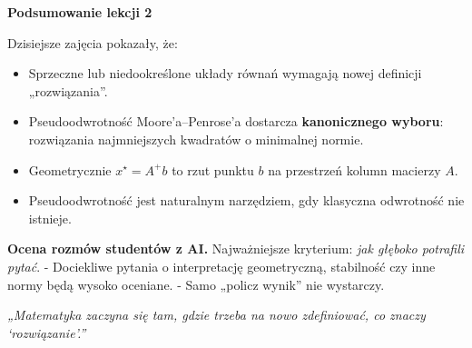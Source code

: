 \documentclass[12pt,a4paper]{article}
\begin{document}
\begin{center}
\Large \textbf{Podsumowanie lekcji 2}
\end{center}

\bigskip

Dzisiejsze zajęcia pokazały, że:
\begin{itemize}
    \item Sprzeczne lub niedookreślone układy równań wymagają nowej definicji „rozwiązania”.
    \item Pseudoodwrotność Moore’a--Penrose’a dostarcza \textbf{kanonicznego wyboru}: rozwiązania najmniejszych kwadratów o minimalnej normie.
    \item Geometrycznie $x^\star=A^+b$ to rzut punktu $b$ na przestrzeń kolumn macierzy $A$.
    \item Pseudoodwrotność jest naturalnym narzędziem, gdy klasyczna odwrotność nie istnieje.
\end{itemize}

\bigskip

\textbf{Ocena rozmów studentów z AI.}  
Najważniejsze kryterium: \emph{jak głęboko potrafili pytać}.  
- Dociekliwe pytania o interpretację geometryczną, stabilność czy inne normy będą wysoko oceniane.  
- Samo „policz wynik” nie wystarczy.  

\bigskip

\begin{center}
\textit{„Matematyka zaczyna się tam, gdzie trzeba na nowo zdefiniować, co znaczy ‘rozwiązanie’.”}
\end{center}
\end{document}
